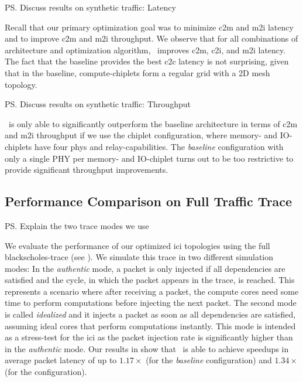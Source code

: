\ps{Discuss results on synthetic traffic: Latency}

Recall that our primary optimization goal was to minimize \gls{c2m} and \gls{m2i} latency and to improve \gls{c2m} and \gls{m2i} throughput.
We observe that for all combinations of architecture and optimization algorithm, \name~improves \gls{c2m}, \gls{c2i}, and \gls{m2i} latency.
The fact that the baseline provides the best \gls{c2c} latency is not surprising, given that in the baseline, compute-chiplets form a regular grid with a 2D mesh topology.


\ps{Discuss results on synthetic traffic: Throughput}

\name~is only able to significantly outperform the baseline architecture in terms of \gls{c2m} and \gls{m2i} throughput if we use the \textit{\name} chiplet configuration, where memory- and IO-chiplets have four \gls{phys} and relay-capabilities. The \textit{baseline} configuration with only a single PHY per memory- and IO-chiplet turns out to be too restrictive to provide significant throughput improvements.




\subsection{Performance Comparison on Full Traffic Trace}
\label{ssec:eval-trace-full}

\ps{Explain the two trace modes we use}

We evaluate the performance of our optimized \gls{ici} topologies using the full blackscholes-trace (see ).
We simulate this trace in two different simulation modes:
In the \emph{authentic} mode, a packet is only injected if all dependencies are satisfied and the cycle, in which the packet appears in the trace, is reached.
This represents a scenario where after receiving a packet, the compute cores need some time to perform computations before injecting the next packet.
The second mode is called \emph{idealized} and it injects a packet as soon as all dependencies are satisfied, assuming ideal cores that perform computations instantly.
This mode is intended as a stress-test for the \gls{ici} as the packet injection rate is significantly higher than in the \emph{authentic} mode.
Our results in  show that \name~is able to achieve speedups in average packet latency of up to $1.17\times$ (for the \textit{baseline} configuration) and $1.34\times$ (for the \textit{\name} configuration).


